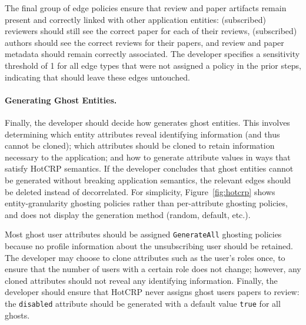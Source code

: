 
The final group of edge policies ensure that review and paper artifacts remain present
and correctly linked with other application entities: (subscribed) reviewers should still see the
correct paper for each of their reviews, (subscribed) authors should see the correct reviews for
their papers, and review and paper metadata should remain correctly associated. The developer
specifies a sensitivity threshold of 1 for all edge types that were not assigned a policy in the
prior steps, indicating that \sys should leave these edges untouched.

\paragraph{Generating Ghost Entities.}
Finally, the developer should decide how \sys generates ghost entities. This involves determining
which entity attributes reveal identifying information (and thus cannot be cloned); which attributes
should be cloned to retain information necessary to the application; and how to generate attribute
values in ways that satisfy HotCRP semantics.
If the developer concludes that ghost entities cannot be generated without breaking application
semantics, the relevant edges should be deleted instead of decorrelated.
For simplicity, Figure~\ref{fig:hotcrp} shows entity-granularity ghosting policies
rather than per-attribute ghosting policies, and does not display the generation method (\eg random, default, etc.).

Most ghost user attributes should be assigned \texttt{GenerateAll} ghosting policies because no
profile information about the unsubscribing user should be retained. The developer may choose to
clone attributes such as the user's roles once, to ensure that the number of users with a certain
role does not change; however, any cloned attributes should not reveal any identifying information.
Finally, the developer should ensure that HotCRP never assigns ghost users papers to review: the
\texttt{disabled} attribute should be generated with a default value \texttt{true} for all ghosts.

